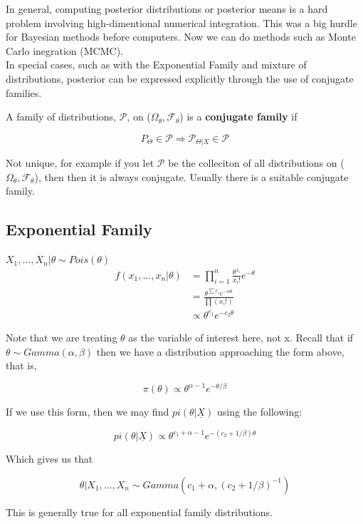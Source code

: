 \documentclass[11pt,fleqn]{book} %
\begin{document}
	In general, computing posterior distributions or posterior means is a hard problem involving high-dimentional numerical integration. This was a big hurdle for Bayesian methods before computers. Now we can do methods such as Monte Carlo inegration (MCMC).\\

	In special cases, such as with the Exponential Family and mixture of distributions, posterior can be expressed explicitly through the use of conjugate families. \\

	\begin{definition}
			A family of distributions, $\mathcal{P}$, on ($\Omega_\theta, \mathcal{F}_\theta$) is a \textbf{conjugate family} if 

					$$P_\Theta \in \mathcal{P} \Rightarrow \mathcal{P}_{\Theta|X} \in \mathcal{P} $$

	
		\end{definition}

Not unique, for example if you let $\mathcal{P}$ be the colleciton of all distributions on ($\Omega_\theta, \mathcal{F}_\theta$), then then it is always conjugate. Usually there is a suitable conjugate family. 

\subsection{Exponential Family}

\begin{example}
	$X_1, \dots, X_n |\theta \sim Pois(\theta)$\\

			\begin{align*}
				f(x_1, \dots, x_n | \theta) &= \prod^n_{i=1} \frac{\theta^{x_i}}{x_i!} e^{-\theta} \\
						&= \frac{\theta^{\sum x_i} e^{-n\theta}}{\prod(x_i!)}\\
						&\propto \theta^{c_1} e^{-c_2 \theta}
			\end{align*}

	Note that we are treating $\theta$ as the variable of interest here, not x. Recall that if $\theta \sim Gamma(\alpha, \beta)$ then we have a distribution approaching the form above, that is, 

			$$\pi(\theta) \propto \theta^{\alpha - 1} e^{-\theta/\beta}$$

	If we use this form, then we may find $pi(\theta|\underline{X})$ using the following:

			$$pi(\theta|\underline{X}) \propto \theta^{c_1 + \alpha -1} e^{-(c_2 + 1/\beta)\theta} $$

	Which gives us that

			$$\theta| X_1, \dots, X_n \sim Gamma(c_1 + \alpha, (c_2 + 1/\beta)^{-1}) $$

	This is generally true for all exponential family distributions. 


\end{example}
\end{document}
